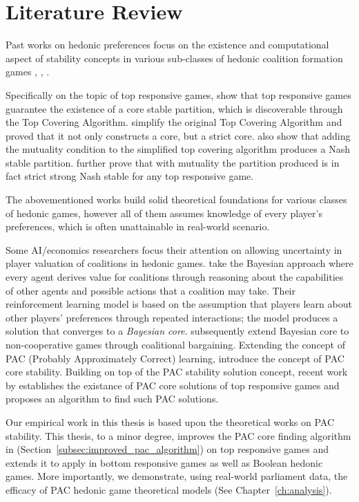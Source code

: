 \chapter{Literature Review}
\label{ch:review}

Past works on hedonic preferences focus on the existence and computational
aspect of stability concepts in various sub-classes of hedonic coalition
formation games
\cite{Aziz:2012:ESH:2343776.2343806}, \cite{aziz_savani_moulin_2016},
\cite{Aziz:2016:BHG:3032027.3032048}.

Specifically on the topic of top responsive games,
 show that top responsive games guarantee the
existence of a core stable partition, which is discoverable through the Top
Covering Algorithm.
 simplify the original Top Covering Algorithm
and proved that it not only constructs a core, but a strict core.
 also show that adding the mutuality condition
to the simplified top covering algorithm produces a Nash stable partition.
 further prove that with mutuality the partition produced
is in fact strict strong Nash stable for any top responsive game.


The abovementioned works build solid theoretical foundations for various
classes of hedonic games, however all of them assumes knowledge of every
player's preferences, which is often unattainable in real-world scenario.

Some AI/economics researchers focus their attention on allowing uncertainty in
player valuation of coalitions in hedonic games.
 take the
Bayesian approach where every agent derives value for coalitions through
reasoning about the capabilities of other agents and possible actions that a
coalition may take.
Their reinforcement learning model is based on the assumption that players
learn about other players' preferences through repeated interactions; the model
produces a solution that converges to a \textit{Bayesian core}.
 subsequently extend Bayesian core to
non-cooperative games through coalitional bargaining.
Extending the concept of PAC (Probably Approximately Correct) learning,
 introduce the concept of PAC
core stability.
Building on top of the PAC stability solution concept, recent work by
 establishes the existance of PAC core solutions
of top responsive games and proposes an algorithm to find such PAC solutions.


Our empirical work in this thesis is based upon the theoretical works on PAC
stability.
This thesis, to a minor degree, improves the PAC core finding algorithm in
\cite{ijcai2017-380} (Section~\ref{subsec:improved_pac_algorithm}) on top
responsive games and extends it to apply in bottom responsive games as well as
Boolean hedonic games.
More importantly, we demonstrate, using real-world parliament data, the
efficacy of PAC hedonic game theoretical models (See Chapter~\ref{ch:analysis}).
